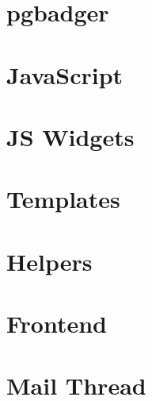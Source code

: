 \documentclass[letterpaper,10pt,spanish]{sphinxmanual}
\begin{document}
\section{pgbadger}
\label{\detokenize{tecnico/herramientas-de-rendimiento/pgbadger:pgbadger}}\label{\detokenize{tecnico/herramientas-de-rendimiento/pgbadger:id1}}\label{\detokenize{tecnico/herramientas-de-rendimiento/pgbadger::doc}}


\section{JavaScript}
\label{\detokenize{tecnico/backend/javascript:javascript}}\label{\detokenize{tecnico/backend/javascript:id1}}\label{\detokenize{tecnico/backend/javascript::doc}}

\section{JS Widgets}
\label{\detokenize{tecnico/backend/js-widgets:js-widgets}}\label{\detokenize{tecnico/backend/js-widgets:id1}}\label{\detokenize{tecnico/backend/js-widgets::doc}}

\section{Templates}
\label{\detokenize{tecnico/backend/templates:templates}}\label{\detokenize{tecnico/backend/templates:id1}}\label{\detokenize{tecnico/backend/templates::doc}}


\section{Helpers}
\label{\detokenize{tecnico/helpers:helpers}}\label{\detokenize{tecnico/helpers:id1}}\label{\detokenize{tecnico/helpers::doc}}


\section{Frontend}
\label{\detokenize{tecnico/frontend:frontend}}\label{\detokenize{tecnico/frontend:id1}}\label{\detokenize{tecnico/frontend::doc}}


\section{Mail Thread}
\label{\detokenize{tecnico/mixin-models/mail-thread:mail-thread}}\label{\detokenize{tecnico/mixin-models/mail-thread:id1}}\label{\detokenize{tecnico/mixin-models/mail-thread::doc}}
\end{document}
